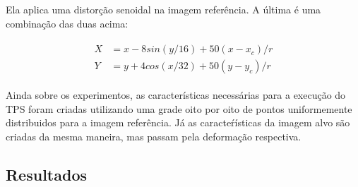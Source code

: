 \documentclass[]{spie}  %
\begin{document}
Ela aplica uma distorção senoidal na imagem referência. A última é uma combinação das duas acima:

\begin{align}
\begin{split}
	X &= x-8sin(y/16) + 50(x-x_c)/r \\
	Y &= y+4cos(x/32) + 50(y-y_c)/r
\end{split} 
\end{align}

	Ainda sobre os experimentos, as características necessárias para a execução do TPS foram criadas
utilizando uma grade oito por oito de pontos uniformemente distribuidos para a imagem referência. Já as
caracteŕísticas da imagem alvo são criadas da mesma maneira, mas passam pela deformação respectiva.

\subsection{Resultados}
\end{document}
